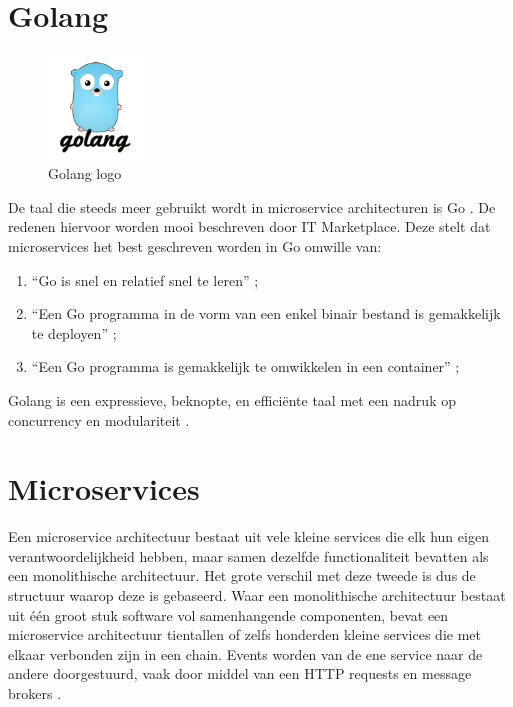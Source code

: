 \section{Golang}
\label{sec:Golang}

\begin{figure}[ht]
    \centering
    \includegraphics[width=2.5cm]{img/golang-logo}
    \caption[Golang logo]{Golang logo \cite{Golang}}
\end{figure}

De taal die steeds meer gebruikt wordt in microservice architecturen is Go \Autocite{Sabic2018}. De redenen hiervoor worden mooi beschreven door IT Marketplace. Deze stelt dat microservices het best geschreven worden in Go omwille van:
\begin{enumerate}
    \item “Go is snel en relatief snel te leren” \autocite{ITMarketplace2016};
    \item “Een Go programma in de vorm van een enkel binair bestand is gemakkelijk te deployen” \autocite{ITMarketplace2016};
    \item “Een Go programma is gemakkelijk te omwikkelen in een container” \autocite{ITMarketplace2016};
\end{enumerate}
Golang is een expressieve, beknopte, en efficiënte taal met een nadruk op concurrency en modulariteit \autocite{Golang2012}.

\section{Microservices}
\label{sec:microservices}

Een microservice architectuur bestaat uit vele kleine services die elk hun eigen verantwoordelijkheid hebben, maar samen dezelfde functionaliteit bevatten als een monolithische architectuur. Het grote verschil met deze tweede is dus de structuur waarop deze is gebaseerd. Waar een monolithische architectuur bestaat uit één groot stuk software vol samenhangende componenten, bevat een microservice architectuur tientallen of zelfs honderden kleine services die met elkaar verbonden zijn in een chain. Events worden van de ene service naar de andere doorgestuurd, vaak door middel van een HTTP requests en message brokers \autocite{Casey2017}. 

